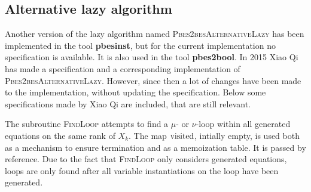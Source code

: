 \subsection{Alternative lazy algorithm}

Another version of the lazy algorithm named \textsc{Pbes2besAlternativeLazy}
has been implemented in the tool \textbf{pbesinst}, but for the current
implementation no specification is available. It is also used in the tool 
\textbf{pbes2bool}. In 2015 Xiao Qi has made a specification and a
corresponding implementation of \textsc{Pbes2besAlternativeLazy}. However,
since then a lot of changes have been made to the implementation, without
updating the specification. Below some specifications made by Xiao Qi are
included, that are still relevant.

The subroutine \textsc{FindLoop} attempts to find a $\mu $- or $\nu $-loop
within all generated equations on the same rank of $X_{k}$. The map $\mathrm{%
visited}$, intially empty, is used both as a mechanism to ensure termination
and as a memoization table. It is passed by reference. Due to the fact that 
\textsc{FindLoop} only considers generated equations, loops are only found
after all variable instantiations on the loop have been generated.

